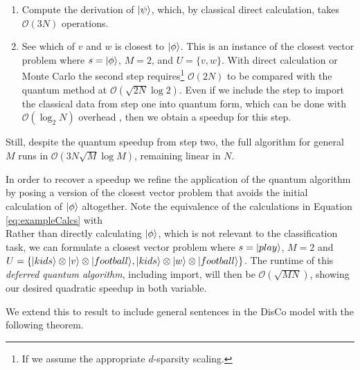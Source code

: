 \begin{enumerate}
\item Compute the derivation of $| \psi \rangle$, which, by classical direct calculation, takes  $\mathcal{O}(3N)$ operations. 

\item See which of $v$ and $w$ is closest to $| \phi \rangle$. This is an instance of the closest vector problem where $s = | \phi \rangle$, $M=2$, and $U = \{v,w\}$. With direct calculation or Monte Carlo the second step requires\footnote{If we assume the appropriate $d$-sparsity scaling.} $\mathcal{O}(2N)$ to be compared with the quantum method at $\mathcal{O}(\sqrt{2N}\log 2)$. Even if we include the step to import the classical data from step one into quantum form, which can be done with $\mathcal{O}(\log_2N)$ overhead \cite{lloyd2013quantum}, then we obtain a speedup for this step. 
\end{enumerate}

Still, despite the quantum speedup from step two, the full algorithm for general $M$ runs in $\mathcal{O}(3N\sqrt{M}\log M)$, remaining linear in $N$.

In order to recover a speedup we refine the application of the quantum algorithm by posing a version of the closest vector problem that avoids the initial calculation of $| \phi \rangle$ altogether. Note the equivalence of the calculations in Equation \ref{eq:exampleCalcs} with 
\begin{equation}
\label{eqn:trick}

\end{equation}
Rather than directly calculating $| \phi \rangle$, which is not relevant to the classification task, we can formulate a closest vector problem where $s = | play \rangle$, $M=2$ and $U = \{| kids \rangle\otimes| v \rangle \otimes| football \rangle,| kids \rangle\otimes| w \rangle \otimes| football \rangle\}$.
The runtime of this \emph{deferred quantum algorithm}, including import, will then be $\mathcal{O}(\sqrt{MN})$, showing our desired quadratic speedup in both variable.

We extend this to result to include general sentences in the DisCo model with the following theorem.

